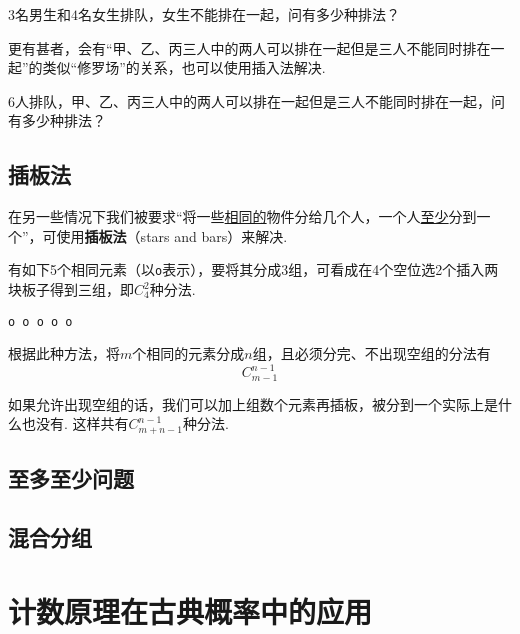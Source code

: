 \begin{example}
	$3$名男生和$4$名女生排队，女生不能排在一起，问有多少种排法？
\end{example}

更有甚者，会有“甲、乙、丙三人中的两人可以排在一起但是三人不能同时排在一起”的类似“修罗场”的关系，也可以使用插入法解决.

\begin{example}
	$6$人排队，甲、乙、丙三人中的两人可以排在一起但是三人不能同时排在一起，问有多少种排法？
\end{example}

\subsection{插板法}
在另一些情况下我们被要求“将一些\uline{相同的}物件分给几个人，一个人\uline{至少}分到一个”，可使用\textbf{插板法}（stars and bars）来解决.

有如下5个相同元素（以\verb|o|表示），要将其分成3组，可看成在4个空位选2个插入两块板子得到三组，即$C_4^2$种分法.

\begin{center}
	\verb*|o o o o o|
\end{center}

根据此种方法，将$m$个相同的元素分成$n$组，且必须分完、不出现空组的分法有\[C_{m-1}^{n-1}\]

如果允许出现空组的话，我们可以加上组数个元素再插板，被分到一个实际上是什么也没有. 这样共有$C_{m+n-1}^{n-1}$种分法.

\subsection{至多至少问题}

\subsection{混合分组}

\section[概率]{计数原理在古典概率中的应用}
